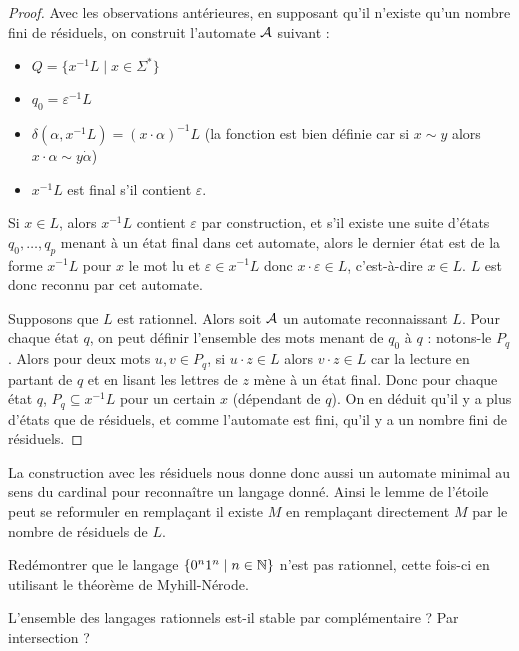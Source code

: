 \begin{proof}
    Avec les observations antérieures, en supposant qu'il n'existe qu'un nombre fini de résiduels, on construit l'automate $\mathcal A$ suivant :
    \begin{itemize}[label=$\bullet$]
        \item $Q = \{x^{-1}L\mid x \in \Sigma^*\}$
        \item $q_0 = \varepsilon^{-1}L$
        \item $\delta(\alpha,x^{-1}L) = (x\cdot \alpha)^{-1}L$ (la fonction est bien définie car si $x\sim y$ alors $x\cdot\alpha \sim y\dot\alpha$)
        \item $x^{-1}L$ est final s'il contient $\varepsilon$.
    \end{itemize}

    Si $x\in L$, alors $x^{-1}L$ contient $\varepsilon$ par construction, et s'il existe une suite d'états $q_0,\ldots,q_p$ menant à un état final dans cet automate, alors le dernier état est de la forme $x^{-1}L$ pour $x$ le mot lu et $\varepsilon\in x^{-1}L$ donc $x\cdot\varepsilon\in L$, c'est-à-dire $x\in L$. $L$ est donc reconnu par cet automate.

    Supposons que $L$ est rationnel. Alors soit $\mathcal A$ un automate reconnaissant $L$. Pour chaque état $q$, on peut définir l'ensemble des mots menant de $q_0$ à $q$ : notons-le $P_q$. Alors pour deux mots $u,v\in P_q$, si $u\cdot z \in L$ alors $v\cdot z \in L$ car la lecture en partant de $q$ et en lisant les lettres de $z$ mène à un état final. Donc pour chaque état $q$, $P_q\subseteq x^{-1}L$ pour un certain $x$ (dépendant de $q$). On en déduit qu'il y a plus d'états que de résiduels, et comme l'automate est fini, qu'il y a un nombre fini de résiduels.
\end{proof}

\begin{rmk}
    La construction avec les résiduels nous donne donc aussi un automate minimal au sens du cardinal pour reconnaître un langage donné. Ainsi le lemme de l'étoile peut se reformuler en remplaçant \og il existe $M$\fg{} en remplaçant directement $M$ par le nombre de résiduels de $L$.
\end{rmk}

\begin{exo}
    Redémontrer que le langage $\{0^n1^n\mid n\in\mathbb{N}\}$ n'est pas rationnel, cette fois-ci en utilisant le théorème de Myhill-Nérode.
\end{exo}

\begin{exo}
    L'ensemble des langages rationnels est-il stable par complémentaire ? Par intersection ?
\end{exo}

